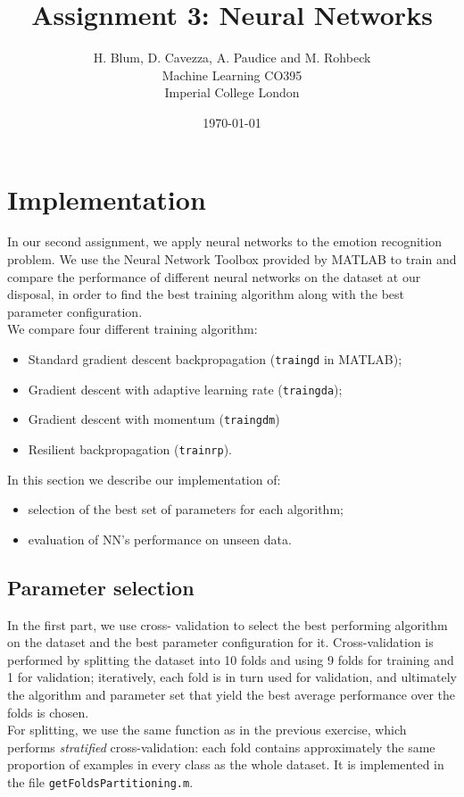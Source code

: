 \documentclass{article}
\begin{document}
\author{H. Blum, D. Cavezza, A. Paudice and M. Rohbeck\\
 Machine Learning CO395\\
  Imperial College London}
\date{\today}
\title{Assignment 3: Neural Networks}
\maketitle

\section{Implementation}
In our second assignment, we apply neural networks to the emotion recognition problem. We use the Neural Network Toolbox provided by MATLAB to train and compare the performance of different neural networks on the dataset at our disposal, in order to find the best training algorithm along with the best parameter configuration.\\
We compare four different training algorithm:
\begin{itemize}
	\item Standard gradient descent backpropagation (\verb$traingd$ in MATLAB);
	\item Gradient descent with adaptive learning rate (\verb$traingda$);
	\item Gradient descent with momentum (\verb$traingdm$)
	\item Resilient backpropagation (\verb$trainrp$).
\end{itemize}
In this section we describe our implementation of:
\begin{itemize}
	\item selection of the best set of parameters for each algorithm;
	\item evaluation of NN's performance on unseen data.
\end{itemize}

\subsection{Parameter selection}
In the first part, we use cross- validation to select the best performing algorithm on the dataset and the best parameter configuration for it. Cross-validation is performed by splitting the dataset into 10 folds and using 9 folds for training and 1 for validation; iteratively, each fold is in turn used for validation, and ultimately the algorithm and parameter set that yield the best average performance over the folds is chosen.\\
For splitting, we use the same function as in the previous exercise, which performs \emph{stratified} cross-validation: each fold contains approximately the same proportion of examples in every class as the whole dataset. It is implemented in the file \verb$getFoldsPartitioning.m$.\\
\end{document}
